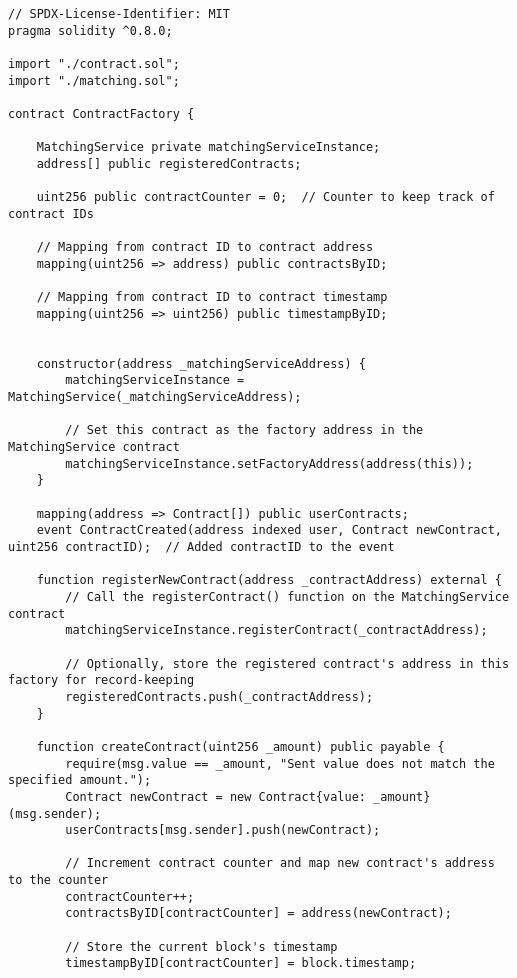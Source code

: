 \begin{lstlisting}
// SPDX-License-Identifier: MIT
pragma solidity ^0.8.0;

import "./contract.sol";
import "./matching.sol";

contract ContractFactory {

    MatchingService private matchingServiceInstance;
    address[] public registeredContracts;

    uint256 public contractCounter = 0;  // Counter to keep track of contract IDs

    // Mapping from contract ID to contract address
    mapping(uint256 => address) public contractsByID;

    // Mapping from contract ID to contract timestamp
    mapping(uint256 => uint256) public timestampByID;


    constructor(address _matchingServiceAddress) {
        matchingServiceInstance = MatchingService(_matchingServiceAddress);

        // Set this contract as the factory address in the MatchingService contract
        matchingServiceInstance.setFactoryAddress(address(this));
    }

    mapping(address => Contract[]) public userContracts;
    event ContractCreated(address indexed user, Contract newContract, uint256 contractID);  // Added contractID to the event

    function registerNewContract(address _contractAddress) external {
        // Call the registerContract() function on the MatchingService contract
        matchingServiceInstance.registerContract(_contractAddress);

        // Optionally, store the registered contract's address in this factory for record-keeping
        registeredContracts.push(_contractAddress);
    }

    function createContract(uint256 _amount) public payable {
        require(msg.value == _amount, "Sent value does not match the specified amount.");
        Contract newContract = new Contract{value: _amount}(msg.sender);
        userContracts[msg.sender].push(newContract);

        // Increment contract counter and map new contract's address to the counter
        contractCounter++;
        contractsByID[contractCounter] = address(newContract);
        
        // Store the current block's timestamp
        timestampByID[contractCounter] = block.timestamp;


\end{lstlisting}
